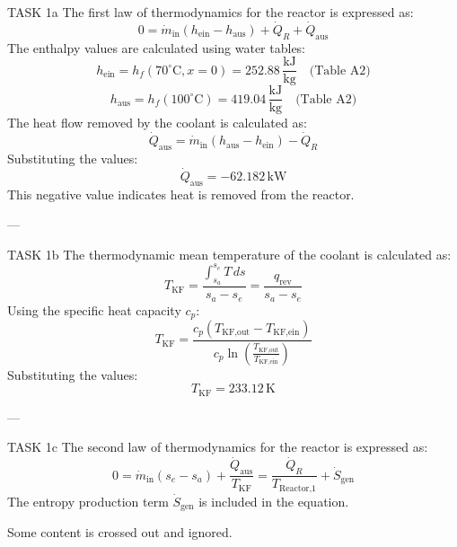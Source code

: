 TASK 1a  
The first law of thermodynamics for the reactor is expressed as:  
\[
0 = \dot{m}_{\text{in}} (h_{\text{ein}} - h_{\text{aus}}) + \dot{Q}_R + \dot{Q}_{\text{aus}}
\]  
The enthalpy values are calculated using water tables:  
\[
h_{\text{ein}} = h_f(70^\circ \text{C}, x = 0) = 252.88 \, \frac{\text{kJ}}{\text{kg}} \quad \text{(Table A2)}
\]  
\[
h_{\text{aus}} = h_f(100^\circ \text{C}) = 419.04 \, \frac{\text{kJ}}{\text{kg}} \quad \text{(Table A2)}
\]  
The heat flow removed by the coolant is calculated as:  
\[
\dot{Q}_{\text{aus}} = \dot{m}_{\text{in}} (h_{\text{aus}} - h_{\text{ein}}) - \dot{Q}_R
\]  
Substituting the values:  
\[
\dot{Q}_{\text{aus}} = -62.182 \, \text{kW}
\]  
This negative value indicates heat is removed from the reactor.

---

TASK 1b  
The thermodynamic mean temperature of the coolant is calculated as:  
\[
T_{\text{KF}} = \frac{\int_{s_a}^{s_e} T \, ds}{s_a - s_e} = \frac{q_{\text{rev}}}{s_a - s_e}
\]  
Using the specific heat capacity \( c_p \):  
\[
T_{\text{KF}} = \frac{c_p (T_{\text{KF,out}} - T_{\text{KF,ein}})}{c_p \ln \left( \frac{T_{\text{KF,out}}}{T_{\text{KF,ein}}} \right)}
\]  
Substituting the values:  
\[
T_{\text{KF}} = 233.12 \, \text{K}
\]

---

TASK 1c  
The second law of thermodynamics for the reactor is expressed as:  
\[
0 = \dot{m}_{\text{in}} (s_e - s_a) + \frac{\dot{Q}_{\text{aus}}}{T_{\text{KF}}} = \frac{\dot{Q}_R}{T_{\text{Reactor,1}}} + \dot{S}_{\text{gen}}
\]  
The entropy production term \( \dot{S}_{\text{gen}} \) is included in the equation.  

Some content is crossed out and ignored.